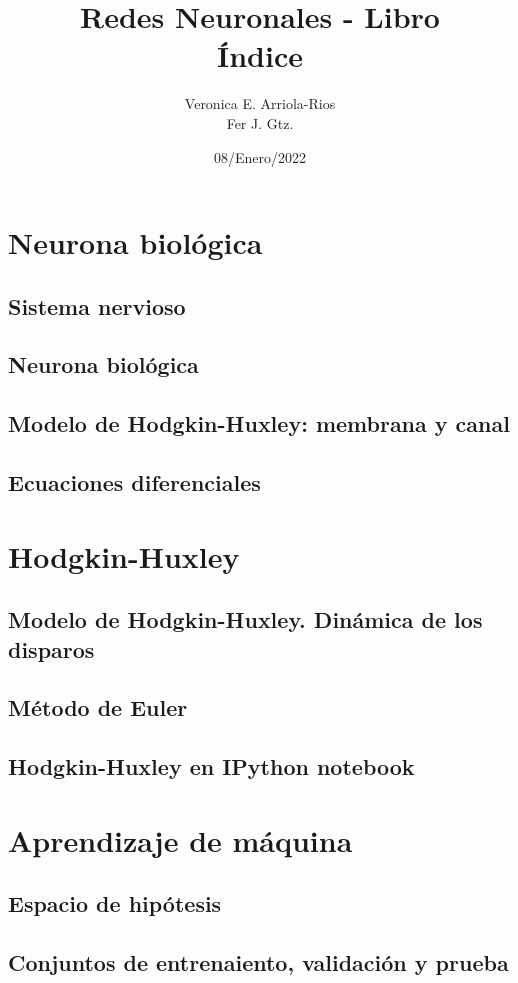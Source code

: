 \documentclass{article}
\title{Redes Neuronales - Libro \\ Índice}
\author{Veronica E. Arriola-Rios \\ Fer J. Gtz.}
\date{08/Enero/2022}
\begin{document}
\maketitle

\section{Neurona biológica}
\subsection{Sistema nervioso}
\subsection{Neurona biológica}
\subsection{Modelo de Hodgkin-Huxley: membrana y canal}
\subsection{Ecuaciones diferenciales}
\section{Hodgkin-Huxley} %
\subsection{Modelo de Hodgkin-Huxley. Dinámica de los disparos}
\subsection{Método de Euler}
\subsection{Hodgkin-Huxley en IPython notebook}
\section{Aprendizaje de máquina} %
\subsection{Espacio de hipótesis}
\subsection{Conjuntos de entrenaiento, validación y prueba}
\end{document}
